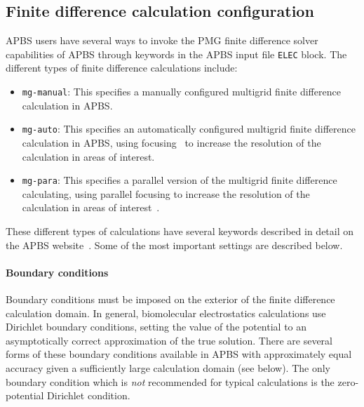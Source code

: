 \documentclass[12pt,titlepage]{article}
\newcommand{\keyword}[1]{\texttt{#1}}
\begin{document}
\subsection{Finite difference calculation configuration} \label{sec:fd-config}
APBS users have several ways to invoke the PMG finite difference solver~\cite{Holst1993} capabilities of APBS through keywords in the APBS input file \keyword{ELEC} block.
The different types of finite difference calculations include:
\begin{itemize}
	\item \keyword{mg-manual}: This specifies a manually configured multigrid finite difference calculation in APBS.
	\item \keyword{mg-auto}: This specifies an automatically configured multigrid finite difference calculation in APBS, using focusing~\cite{Gilson1988} to increase the resolution of the calculation in areas of interest.
	\item \keyword{mg-para}:  This specifies a parallel version of the multigrid finite difference calculating, using parallel focusing to increase the resolution of the calculation in areas of interest~\cite{Baker2001a}.
\end{itemize}
These different types of calculations have several keywords described in detail on the APBS website~\cite{APBSweb}.
Some of the most important settings are described below.

\paragraph{Boundary conditions}
Boundary conditions must be imposed on the exterior of the finite difference calculation domain.
In general, biomolecular electrostatics calculations use Dirichlet boundary conditions, setting the value of the potential to an asymptotically correct approximation of the true solution.
There are several forms of these boundary conditions available in APBS with approximately equal accuracy given a sufficiently large calculation domain (see below).
The only boundary condition which is \emph{not} recommended for typical calculations is the zero-potential Dirichlet condition.
\end{document}

